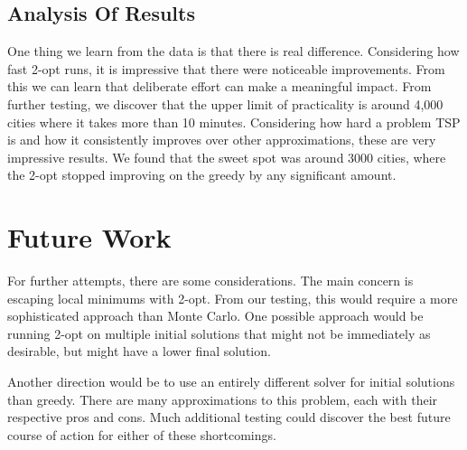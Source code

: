 \documentclass[12pt]{report}
\begin{document}
\begin{multicols}{2}
    \subsection{Analysis Of Results}
    One thing we learn from the data is that there is real difference. Considering how fast 2-opt runs, it is impressive that there were noticeable improvements. From this we can learn that deliberate effort can make a meaningful impact. From further testing, we discover that the upper limit of practicality is around 4,000 cities where it takes more than 10 minutes. Considering how hard a problem TSP is and how it consistently improves over other approximations, these are very impressive results. We found that the sweet spot was around 3000 cities, where the 2-opt stopped improving on the greedy by any significant amount.

    \section{Future Work}
    For further attempts, there are some considerations. The main concern is escaping local minimums with 2-opt. From our testing, this would require a more sophisticated approach than Monte Carlo. One possible approach would be running 2-opt on multiple initial solutions that might not be immediately as desirable, but might have a lower final solution.

    Another direction would be to use an entirely different solver for initial solutions than greedy. There are many approximations to this problem, each with their respective pros and cons. Much additional testing could discover the best future course of action for either of these shortcomings.
\end{multicols}
\end{document}
